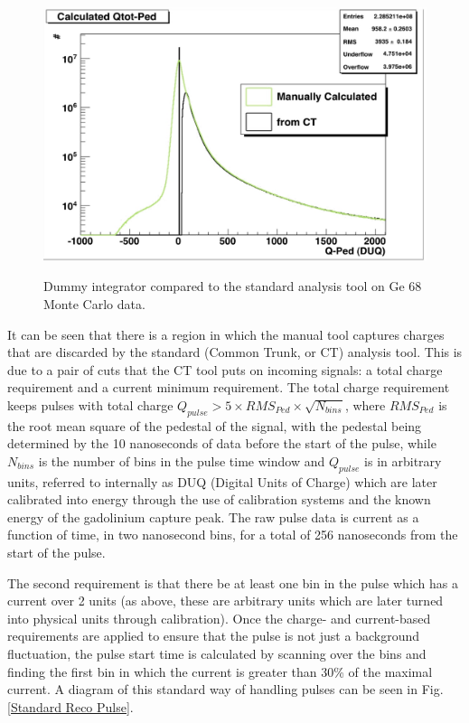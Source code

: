 \begin{figure}
\caption{Dummy integrator compared to the standard analysis tool on Ge 68 Monte Carlo data.}
\includegraphics[width=\textwidth]{DC_Results/DI_Ge68_Colorized.jpg}
\label{DI vs. SAT}
\end{figure}

It can be seen that there is a region in which the manual tool captures charges that are discarded by the standard (Common Trunk, or CT) analysis tool. This is due to a pair of cuts that the CT tool puts on incoming signals: a total charge requirement and a current minimum requirement. The total charge requirement keeps pulses with total charge $Q_{pulse} > 5 \times RMS_{Ped} \times \sqrt{N_{bins}}$, where $RMS_{Ped}$ is the root mean square of the pedestal of the signal, with the pedestal being determined by the 10 nanoseconds of data before the start of the pulse, while $N_{bins}$ is the number of bins in the pulse time window and $ Q_{pulse}$ is in arbitrary units, referred to internally as DUQ (Digital Units of Charge) which are later calibrated into energy through the use of calibration systems and the known energy of the gadolinium capture peak. The raw pulse data is current as a function of time, in two nanosecond bins, for a total of 256 nanoseconds from the start of the pulse. 

The second requirement is that there be at least one bin in the pulse which has a current over 2 units (as above, these are arbitrary units which are later turned into physical units through calibration). Once the charge- and current-based requirements are applied to ensure that the pulse is not just a background fluctuation, the pulse start time is calculated by scanning over the bins and finding the first bin in which the current  is greater than 30\% of the maximal current. A diagram of this standard way of handling pulses can be seen in Fig. \ref{Standard Reco Pulse}.


